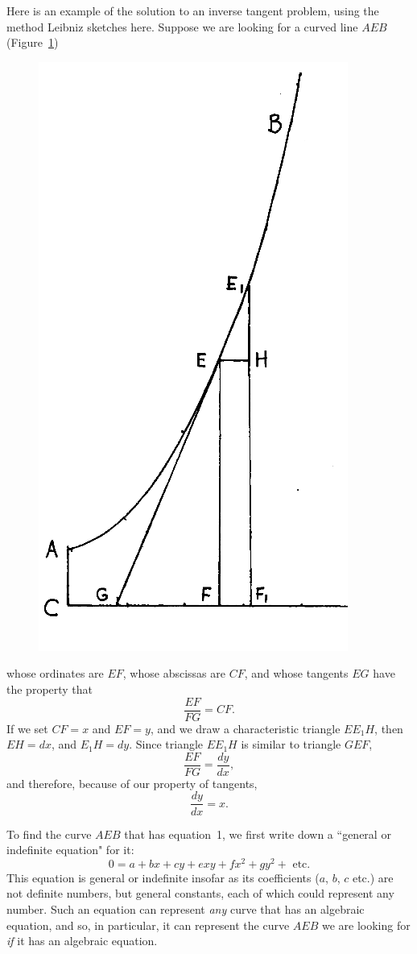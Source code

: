 \documentclass[twoside,openright]{article}
\begin{document}
Here is an example of the solution to an inverse tangent problem,
using the method Leibniz sketches here.  Suppose we are looking for a
curved line $AEB$ (Figure~\ref{invtan})
\begin{figure}[htp]
\begin{center}
\includegraphics[width=.5\textwidth]{fig/Figure33}
\caption{}
\label{invtan}
\vspace{-10pt}
\end{center}
\end{figure} whose ordinates are $EF$, whose abscissas are $CF$, and
whose tangents $EG$ have the property that
$$\frac{EF}{FG} = CF.$$
If we set $CF=x$ and $EF =y$, and we draw a characteristic triangle
$EE_1H$, then $EH =dx$, and $E_1H=dy$.  Since triangle $EE_1H$ is
similar to triangle $GEF$,
$$\frac{EF}{FG} = \frac{dy}{dx},$$
and therefore, because of our property of tangents,
\begin{equation}
\frac{dy}{dx} = x.
\end{equation}


To find the curve $AEB$ that has equation~1, we first write down a ``general or indefinite equation" for it:
\begin{equation}
\label{geneq}
 0 = a + bx + cy + exy + fx^2 + gy^2 + \mbox{ etc.}
 \end{equation}
 This equation is general or indefinite insofar as its coefficients
 ($a$, $b$, $c$ etc.) are not definite numbers, but general constants,
 each of which could represent any number.  Such an equation can
 represent {\em any} curve that has an algebraic equation, and so, in
 particular, it can represent the curve $AEB$ we are looking for {\em
   if} it has an algebraic equation.
\end{document}
